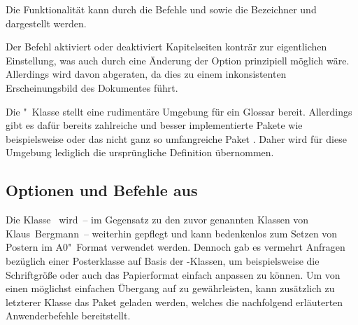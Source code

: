 \begin{DeclareEntity}{}
\begin{Declaration}
  {}
\printdeclarationlist

Die Funktionalität kann durch die Befehle  und 
 sowie die Bezeichner  und 
 dargestellt werden.
\end{Declaration}

\begin{Declaration}
  {}
\printdeclarationlist

Der Befehl aktiviert oder deaktiviert Kapitelseiten konträr zur eigentlichen 
Einstellung, was auch durch eine Änderung der Option  
prinzipiell möglich wäre. Allerdings wird davon abgeraten, da dies zu einem 
inkonsistenten Erscheinungsbild des Dokumentes führt.
\end{Declaration}

\begin{Declaration}
  {}
\begin{Declaration}
  {}
\printdeclarationlist

Die "~Klasse stellt eine rudimentäre Umgebung für ein 
Glossar bereit. Allerdings gibt es dafür bereits zahlreiche und besser 
implementierte Pakete wie beispielsweise  oder das nicht 
ganz so umfangreiche Paket . Daher wird für diese Umgebung 
lediglich die ursprüngliche Definition übernommen. 
\end{Declaration}
\end{Declaration}
%



\subsection{%
  Optionen und Befehle aus %
}

%
Die Klasse~ wird~-- im Gegensatz zu den zuvor genannten 
Klassen von Klaus~Bergmann~-- weiterhin gepflegt und kann bedenkenlos zum 
Setzen von Postern im A0"~Format verwendet werden. Dennoch gab es vermehrt 
Anfragen bezüglich einer Posterklasse auf Basis der \TUDScript-Klassen, um 
beispielsweise die Schriftgröße oder auch das Papierformat einfach anpassen zu 
können. Um von  einen möglichst einfachen Übergang auf 
 zu gewährleisten, kann zusätzlich zu letzterer Klasse das 
Paket  geladen werden, welches die nachfolgend erläuterten 
Anwenderbefehle bereitstellt.


\end{DeclareEntity}
